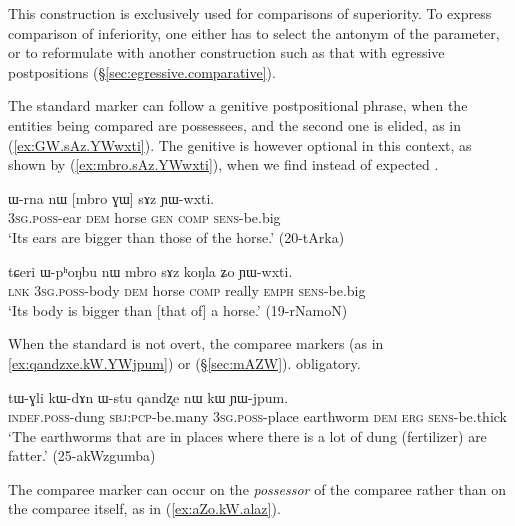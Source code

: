 This construction is exclusively used for comparisons of superiority. To express comparison of inferiority, one either has to select the antonym of the parameter, or to reformulate with another construction such as that with egressive postpositions (§\ref{sec:egressive.comparative}).

The standard marker can follow a genitive postpositional phrase, when the entities being compared are possessees, and the second one is elided, as in (\ref{ex:GW.sAz.YWwxti}). The genitive is however optional in this context, as shown by (\ref{ex:mbro.sAz.YWwxti}), when we find  instead of expected .

\begin{exe}
\ex \label{ex:GW.sAz.YWwxti}
\gll  ɯ-rna nɯ [mbro ɣɯ] sɤz ɲɯ-wxti. \\
\textsc{3sg}.\textsc{poss}-ear \textsc{dem} horse \textsc{gen} \textsc{comp} \textsc{sens}-be.big \\
\glt `Its ears are bigger than those of the horse.' (20-tArka)
\end{exe}

\begin{exe}
\ex \label{ex:mbro.sAz.YWwxti}
\gll  tɕeri ɯ-pʰoŋbu nɯ mbro sɤz koŋla ʑo ɲɯ-wxti. \\
\textsc{lnk} \textsc{3sg}.\textsc{poss}-body \textsc{dem} horse \textsc{comp} really \textsc{emph} \textsc{sens}-be.big \\
\glt `Its body is bigger than [that of] a horse.' (19-rNamoN)
\end{exe}

When the standard is not overt, the comparee markers  (as in \ref{ex:qandzxe.kW.YWjpum}) or  (§\ref{sec:mAZW}). obligatory.

\begin{exe}
\ex \label{ex:qandzxe.kW.YWjpum}
\gll tɯ-ɣli kɯ-dɤn ɯ-stu qandʐe nɯ kɯ ɲɯ-jpum. \\
\textsc{indef}.\textsc{poss}-dung \textsc{sbj}:\textsc{pcp}-be.many \textsc{3sg}.\textsc{poss}-place earthworm \textsc{dem} \textsc{erg} \textsc{sens}-be.thick \\
\glt `The earthworms that are in places where there is a lot of dung (fertilizer) are fatter.' (25-akWzgumba)
\end{exe}

The comparee marker  can occur on the \textit{possessor} of the comparee rather than on the comparee itself, as in (\ref{ex:aZo.kW.alaz}).

